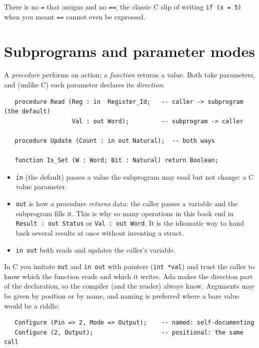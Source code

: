 There is no \texttt{=} that assigns and no \texttt{==}; the classic C slip of
writing \texttt{if (x = 5)} when you meant \texttt{==} cannot even be expressed.

\section{Subprograms and parameter modes}

A \emph{procedure} performs an action; a \emph{function} returns a value. Both take
parameters, and (unlike C) each parameter declares its \emph{direction}:

\begin{lstlisting}
   procedure Read (Reg : in  Register_Id;   -- caller -> subprogram (the default)
                   Val : out Word);         -- subprogram -> caller

   procedure Update (Count : in out Natural);  -- both ways

   function Is_Set (W : Word; Bit : Natural) return Boolean;
\end{lstlisting}

\begin{itemize}
  \item \texttt{in} (the default) passes a value the subprogram may read but not
        change: a C value parameter.
  \item \texttt{out} is how a procedure \emph{returns} data: the caller passes a
        variable and the subprogram fills it. This is why so many operations in this
        book end in \texttt{Result : out Status} or \texttt{Val : out Word}. It is
        the idiomatic way to hand back several results at once without inventing a
        struct.
  \item \texttt{in out} both reads and updates the caller's variable.
\end{itemize}

In C you imitate \texttt{out} and \texttt{in out} with pointers (\texttt{int *val})
and trust the caller to know which the function reads and which it writes. Ada makes
the direction part of the declaration, so the compiler (and the reader) always
know. Arguments may be given by position or by name, and naming is preferred where
a bare value would be a riddle:

\begin{lstlisting}
   Configure (Pin => 2, Mode => Output);    -- named: self-documenting
   Configure (2, Output);                   -- positional: the same call
\end{lstlisting}

